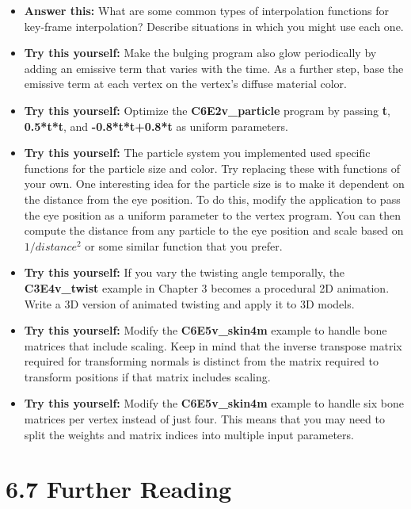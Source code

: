 \documentclass[../main.tex]{subfiles}
\begin{document}
\begin{itemize}

\item \textbf{Answer this:} What are some common types of interpolation functions for key-frame interpolation? Describe situations in which you might use each one.

\item \textbf{Try this yourself:} Make the bulging program also glow periodically by adding an emissive term that varies with the time. As a further step, base the emissive term at each vertex on the vertex's diffuse material color.

\item \textbf{Try this yourself:} Optimize the \textbf{C6E2v_particle} program by passing \textbf{t}, \textbf{0.5*t*t}, and \textbf{-0.8*t*t+0.8*t} as uniform parameters.

\item \textbf{Try this yourself:} The particle system you implemented used specific functions for the particle size and color. Try replacing these with functions of your own. One interesting idea for the particle size is to make it dependent on the distance from the eye position. To do this, modify the application to pass the eye position as a uniform parameter to the vertex program. You can then compute the distance from any particle to the eye position and scale based on $1/distance^2$ or some similar function that you prefer.

\item \textbf{Try this yourself:} If you vary the twisting angle temporally, the \textbf{C3E4v_twist} example in Chapter 3 becomes a procedural 2D animation. Write a 3D version of animated twisting and apply it to 3D models.

\item \textbf{Try this yourself:} Modify the \textbf{C6E5v_skin4m} example to handle bone matrices that include scaling. Keep in mind that the inverse transpose matrix required for transforming normals is distinct from the matrix required to transform positions if that matrix includes scaling.

\item \textbf{Try this yourself:} Modify the \textbf{C6E5v_skin4m} example to handle six bone matrices per vertex instead of just four. This means that you may need to split the weights and matrix indices into multiple input parameters.
\end{itemize}

\section{6.7 Further Reading}
\end{document}

